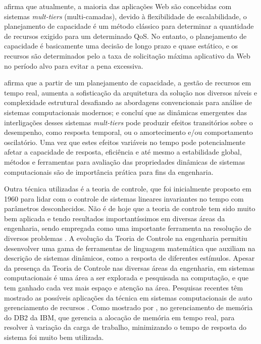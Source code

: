  afirma que atualmente, a maioria das aplicações Web são concebidas com sistemas \textit{mult-tiers} (multi-camadas), devido à flexibilidade de escalabilidade, o planejamento de capacidade é um método clássico para determinar a quantidade de recursos exigido para um determinado QoS. No entanto, o planejamento de capacidade é basicamente uma decisão de longo prazo e quase estático, e os recursos são determinados pelo a taxa de solicitação máxima aplicativo da Web no período alvo para evitar a pena excessiva.

 afirma que a partir de um planejamento de capacidade, a gestão de recursos em tempo real, aumenta a sofisticação da arquitetura da solução nos diversos níveis e complexidade estrutural desafiando as abordagens convencionais para análise de sistemas computacionais modernos; e concluí que as dinâmicas emergentes das interligações desses sistemas \textit{mult-tiers} pode produzir efeitos transitórios sobre o desempenho, como resposta temporal, ou o amortecimento e/ou comportamento oscilatório. Uma vez que estes efeitos variáveis no tempo pode potencialmente afetar a capacidade de resposta, eficiência e até mesmo a estabilidade global, métodos e ferramentas para avaliação das propriedades dinâmicas de sistemas computacionais são de importância prática para fins da engenharia.

Outra técnica utilizadas é a teoria de controle, que foi inicialmente proposto em 1960 para lidar com o controle de sistemas lineares invariantes no tempo com parâmetros desconhecidos. Não é de hoje que a teoria de controle tem sido muito bem aplicada e tendo resultados importantíssimos em diversas áreas da engenharia, sendo empregada como uma importante ferramenta na resolução de diversos problemas \cite{Ogata2001}. A evolução da Teoria de Controle na engenharia permitiu desenvolver uma gama de ferramentas de linguagem matemática que auxiliam na descrição de sistemas dinâmicos, como a resposta de diferentes estímulos. Apesar da presença da Teoria de Controle nas diversas áreas da engenharia, em sistemas computacionais é uma área a ser explorada e pesquisada na computação, e que tem ganhado cada vez mais espaço e atenção na área. Pesquisas recentes têm mostrado as possíveis aplicações da técnica em sistemas computacionais de auto gerenciamento de recursos \cite{Nobile2013}. Como mostrado por , no gerenciamento de memória do DB2 da IBM, que gerencia a alocação de memória em tempo real, para resolver à variação da carga de trabalho, minimizando o tempo de resposta do sistema foi muito bem utilizada.

